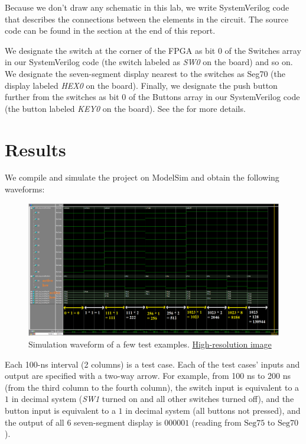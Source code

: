 \documentclass[12pt]{article}
\begin{document}
Because we don't draw any schematic in this lab, we write SystemVerilog code that describes the connections between the elements in the circuit. The source code can be found in the  section at the end of this report.

We designate the switch at the corner of the FPGA as bit $0$ of the Switches array in our SystemVerilog code (the switch labeled as \textit{SW0} on the board) and so on. We designate the seven-segment display nearest to the switches as Seg70 (the display labeled \textit{HEX0} on the board). Finally, we designate the push button further from the switches as bit $0$ of the Buttons array in our SystemVerilog code (the button labeled \textit{KEY0} on the board). See the  for more details.

\section{Results}

We compile and simulate the project on ModelSim and obtain the following waveforms:

\begin{figure}[ht]
  \centering
  \includegraphics[width=\textwidth]{lab4_simulation.png}
  \caption{Simulation waveform of a few test examples. \href{https://i.imgur.com/1UjCN6E.png}{High-resolution image}}
  \label{figure:3}
\end{figure}

\newpage

Each 100-ns interval (2 columns) is a test case. Each of the test cases' inputs and output are specified with a two-way arrow. For example, from 100 ns to 200 ns (from the third column to the fourth column), the switch input is equivalent to a $1$ in decimal system (\textit{SW1} turned on and all other switches turned off), and the button input is equivalent to a $1$ in decimal system (all buttons not pressed), and the output of all 6 seven-segment display is $000001$ (reading from $\text{Seg75}$ to $\text{Seg70}$).
\end{document}

